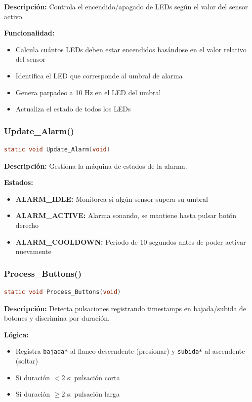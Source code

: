 \documentclass[12pt,a4paper]{article}
\begin{document}
\textbf{Descripción:} Controla el encendido/apagado de LEDs según el valor del sensor activo.

\textbf{Funcionalidad:}
\begin{itemize}
    \item Calcula cuántos LEDs deben estar encendidos basándose en el valor relativo del sensor
    \item Identifica el LED que corresponde al umbral de alarma
    \item Genera parpadeo a 10 Hz en el LED del umbral
    \item Actualiza el estado de todos los LEDs
\end{itemize}

\subsubsection{Update\_Alarm()}
\begin{lstlisting}[language=C, caption=Actualización del estado de alarma]
static void Update_Alarm(void)
\end{lstlisting}

\textbf{Descripción:} Gestiona la máquina de estados de la alarma.

\textbf{Estados:}
\begin{itemize}
    \item \textbf{ALARM\_IDLE:} Monitorea si algún sensor supera su umbral
    \item \textbf{ALARM\_ACTIVE:} Alarma sonando, se mantiene hasta pulsar botón derecho
    \item \textbf{ALARM\_COOLDOWN:} Período de 10 segundos antes de poder activar nuevamente
\end{itemize}

\subsubsection{Process\_Buttons()}
\begin{lstlisting}[language=C, caption=Procesamiento de entrada de botones]
static void Process_Buttons(void)
\end{lstlisting}

\textbf{Descripción:} Detecta pulsaciones registrando timestamps en bajada/subida de botones y discrimina por duración.

\textbf{Lógica:}
\begin{itemize}
    \item Registra \texttt{bajada*} al flanco descendente (presionar) y \texttt{subida*} al ascendente (soltar)
    \item Si duración $< 2$ s: pulsación corta
    \item Si duración $\geq 2$ s: pulsación larga
\end{itemize}
\end{document}

